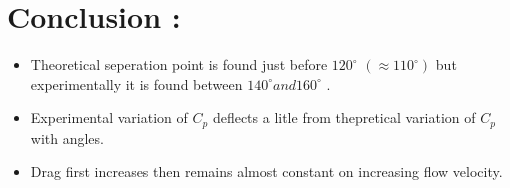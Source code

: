 \documentclass[12pt,a4paper]{article}
\begin{document}
\section{Conclusion :}
\begin{itemize}
    \item Theoretical seperation point is found just before $120^{\circ}$ $(\approx 110 ^{\circ})$ but experimentally it is found between $140^{\circ}  and  160^{\circ}$ .
    \item Experimental variation of $C_p$ deflects a litle from thepretical variation of $C_p$ with angles.
    \item Drag first increases then remains almost constant on increasing flow velocity.
\end{itemize}
\end{document}
